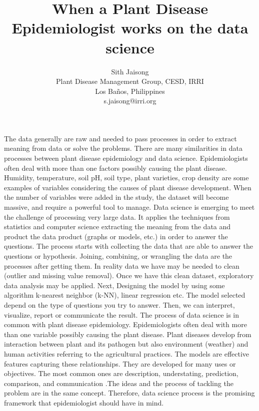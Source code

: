 \documentclass[12pt,a4paper]{article}
\begin{document}
\thispagestyle{empty}

\title{\textbf{When a Plant Disease Epidemiologist works on the data science}}
\author{Sith Jaisong \\
Plant Disease Management Group, CESD, IRRI\\ Los Ba\~{n}os, Philippines\\
s.jaisong@irri.org}
\date{} %
\maketitle\thispagestyle{empty} %
The data generally are raw and needed to pass processes in order to extract meaning from data or solve the problems. There are many similarities in data processes between plant disease epidemiology and data science. Epidemiologists often deal with more than one factors possibly causing the plant disease. Humidity, temperature, soil pH, soil type, plant varieties, crop density are some examples of variables considering the causes of plant disease development. When the number of variables were added in the study, the dataset will become massive, and require a powerful tool to manage. Data science is emerging to meet the challenge of processing very large data. It applies the techniques from statistics and computer science extracting the meaning from the data and product the data product (graphs or models, etc.) in order to answer the questions. The process \cite{schutt2013doing} starts with collecting the data that are able to answer the questions or hypothesis. Joining, combining, or wrangling the data are the processes after getting them. In reality data we have may be needed to clean (outlier and missing value removal). Once we have this clean dataset, exploratory data analysis may be applied. Next, Designing the model by using some algorithm k-nearest neighbor (k-NN), linear regression etc. The model selected depend on the type of questions you try to answer. Then, we can interpret, visualize, report or communicate the result. The process of data science is in common with plant disease epidemiology. Epidemiologists often deal with more than one variable possibly causing the plant disease. Plant diseases develop from interaction between plant and its pathogen but also environment (weather) and human activities referring to the agricultural practices. The models are effective features capturing these relationships. They are developed for many uses or objectives. The most common ones are description, understating, prediction, comparison, and communication \cite{madden2007study}.The ideas and the process of tackling the problem are in the same concept. Therefore, data science process is the promising framework that epidemiologist should have in mind.
\end{document}
